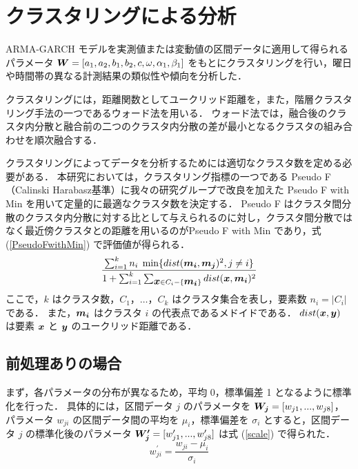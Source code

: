 \documentclass[a4j]{jarticle}
\def \vector#1{\mbox{\boldmath $#1$}}
\begin{document}
\section{クラスタリングによる分析}
 ARMA-GARCH モデルを実測値または変動値の区間データに適用して得られるパラメータ $\vector{W} = [a_1, a_2, b_1, b_2, c, \omega, \alpha_1, \beta_1]$ をもとにクラスタリングを行い，曜日や時間帯の異なる計測結果の類似性や傾向を分析した．
 
 クラスタリングには，距離関数としてユークリッド距離を，また，階層クラスタリング手法の一つであるウォード法\cite{murtagh2014ward}を用いる．
ウォード法では，融合後のクラスタ内分散と融合前の二つのクラスタ内分散の差が最小となるクラスタの組み合わせを順次融合する．

クラスタリングによってデータを分析するためには適切なクラスタ数を定める必要がある．
本研究においては，クラスタリング指標の一つである Pseudo F（Calinski Harabasz基準）\cite{liu2010understanding}に我々の研究グループで改良を加えた Pseudo F with Min\cite{kanajiri} を用いて定量的に最適なクラスタ数を決定する．
Pseudo F はクラスタ間分散のクラスタ内分散に対する比として与えられるのに対し，クラスタ間分散ではなく最近傍クラスタとの距離を用いるのがPseudo F with Min であり，式 (\ref{PseudoFwithMin}) で評価値が得られる．
\begin{equation}
\frac{\sum^k_{i=1} n_{i}\hspace{0.1cm} \min \{ dist(\vector{m_{i}},\vector{m_j})^2,j \neq i \}}{1 + \sum^k_{i=1} \sum_{\vector{x} \in C_i - \{\vector{m_i}\}} dist(\vector{x},\vector{m_{i}})^2}
\label{PseudoFwithMin}
\end{equation}
ここで，$k$ はクラスタ数，$C_1，\ldots，C_k$ はクラスタ集合を表し，要素数 $n_i=|C_i|$ である．
また，$\vector{m_i}$ はクラスタ $i$ の代表点であるメドイドである\cite{mouratidis2005medoid}．
$dist(\vector{x},\vector{y})$ は要素 $\vector{x}$ と $\vector{y}$ のユークリッド距離である．

\subsection{前処理ありの場合}
 まず，各パラメータの分布が異なるため，平均 0，標準偏差 1 となるように標準化を行った．
具体的には，区間データ $j$ のパラメータを $\vector{W_j} = [w_{j1},...,w_{j8}]$，パラメータ $w_{ji}$ の区間データ間の平均を $\mu_i$，標準偏差を $\sigma_i$ とすると，区間データ $j$ の標準化後のパラメータ $\vector{W_j^\prime} = [w_{j1}^\prime,...,w_{j8}^\prime]$ は式 (\ref{scale}) で得られた．
\begin{equation}
w_{ji}^\prime = \frac{w_{ji} - \mu_i}{\sigma_i}
\label{scale}
\end{equation}
\end{document}
